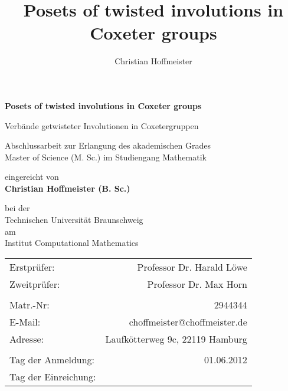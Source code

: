 \title{Posets of twisted involutions in Coxeter groups}
\author{Christian Hoffmeister}

\begin{titlepage}
\begin{center}
{\Large \bf Posets of twisted involutions in Coxeter groups}

{\large Verbände getwisteter Involutionen in Coxetergruppen}

\vspace*{2.5cm}
Abschlussarbeit zur Erlangung des akademischen Grades\\
Master of Science (M. Sc.) im Studiengang Mathematik

\vspace*{2.5cm}
eingereicht von \\
{\Large \bf Christian Hoffmeister (B. Sc.)}

\vspace*{2.5cm}
bei der \\
Technischen Universität Braunschweig \\
am \\
Institut Computational Mathematics

\vfill
\begin{tabular}{lr}
	Erstprüfer: & Professor Dr. Harald Löwe \\
	Zweitprüfer: & Professor Dr. Max Horn \\
	\vspace*{0.5em} & \\
	Matr.-Nr: & 2944344 \\
	E-Mail: & choffmeister@choffmeister.de \\
	Adresse: & Laufkötterweg 9c, 22119 Hamburg \\
	\vspace*{0.5em} & \\
	Tag der Anmeldung: & 01.06.2012 \\
	Tag der Einreichung: & \\
\end{tabular}
\end{center}
\end{titlepage}